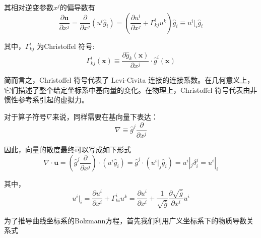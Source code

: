 \documentclass[MathematicsNumericsDerivationsAndOpenFOAM.tex]{subfiles}
\begin{document}
其相对逆变参数$x^j$的偏导数有
\begin{equation}
  \frac{\partial \boldsymbol{u}}{\partial x^{j}}=\frac{\partial}{\partial x^{j}}\left(u^{i} \widehat{g}_{i}\right)=\left(\frac{\partial u^{i}}{\partial x^{j}}+\Gamma_{k j}^{i} u^{k}\right) \widehat{g}_{i}\equiv u^{i}|_{i} \widehat{g}_{i}
\end{equation}

其中，$\Gamma_{k j}^{i} $ 为Christoffel 符号:
\begin{equation}
  \Gamma_{k j}^{i}(\boldsymbol{x}) \equiv \frac{\partial \widehat{g}_{k}(\boldsymbol{x})}{\partial x^{j}} \cdot \widehat{g}^{i}(\boldsymbol{x})
\end{equation}

简而言之，Christoffel 符号代表了 Levi-Civita 连接的连接系数。在几何意义上，它们描述了整个给定坐标系中基向量的变化。在物理上，Christoffel 符号代表由非惯性参考系引起的虚拟力。


对于算子符号$\nabla$来说，同样需要在基向量下表达：
\begin{equation}
  \nabla\equiv\widehat{g}^{j} \frac{\partial}{\partial x^{j}}
\end{equation}

因此，向量的散度最终可以写成如下形式
\begin{equation}
  \nabla \cdot \boldsymbol{u}=\left(\widehat{g}^{j} \frac{\partial}{\partial x^{j}}\right) \cdot\left(u^{i} \widehat{g}_{i}\right)=\widehat{g}^{j} \cdot\left(u^{i}|_{j} \widehat{g}_{i}\right)=u^{i}|_{j} \delta_{i}^{j}=u^{i}|_{i}
\end{equation}

其中，
\begin{equation}
  u^{i}|_{i}=\frac{\partial u^{i}}{\partial x^{i}}+\Gamma_{k i}^{i} u^{k}=\frac{\partial u^{i}}{\partial x^{i}}+\frac{1}{\sqrt{\widehat{g}}} \frac{\partial \sqrt{\widehat{g}}}{\partial x^{i}} u^{i}
\end{equation}







为了推导曲线坐标系的Bolzmann方程，首先我们利用广义坐标系下的物质导数关系式
\end{document}
